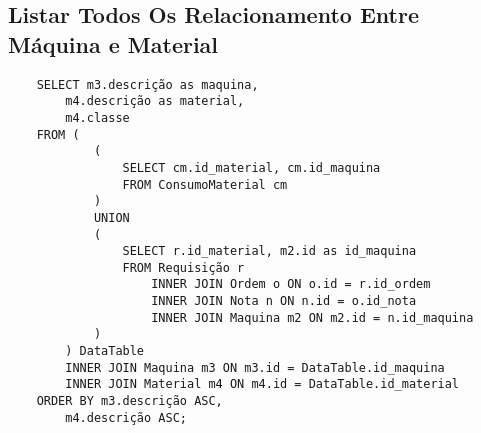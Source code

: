 \subsection{Listar Todos Os Relacionamento Entre Máquina e Material}

\begin{verbatim}
    SELECT m3.descrição as maquina,
        m4.descrição as material,
        m4.classe
    FROM (
            (
                SELECT cm.id_material, cm.id_maquina
                FROM ConsumoMaterial cm
            )
            UNION
            (
                SELECT r.id_material, m2.id as id_maquina
                FROM Requisição r
                    INNER JOIN Ordem o ON o.id = r.id_ordem
                    INNER JOIN Nota n ON n.id = o.id_nota
                    INNER JOIN Maquina m2 ON m2.id = n.id_maquina
            )
        ) DataTable
        INNER JOIN Maquina m3 ON m3.id = DataTable.id_maquina
        INNER JOIN Material m4 ON m4.id = DataTable.id_material
    ORDER BY m3.descrição ASC,
        m4.descrição ASC;
\end{verbatim}
